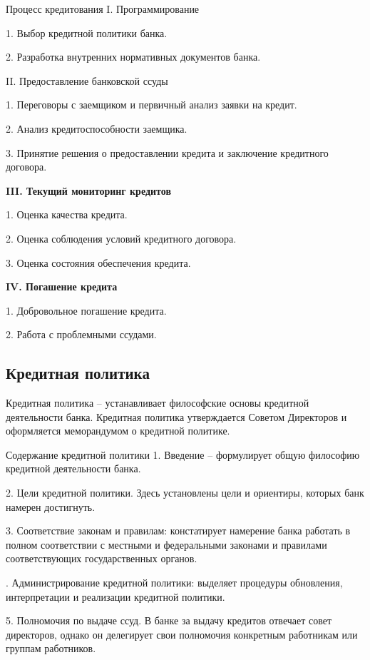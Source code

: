 \documentclass[_Banking_p2.tex]{subfiles}
\begin{document}
\begin{frame}[ allowframebreaks ]{Процесс кредитования}
I. Программирование

1. Выбор кредитной политики банка.

2. Разработка внутренних нормативных
документов банка.

\vspace{1em}
II. Предоставление банковской ссуды

1. Переговоры с заемщиком и первичный анализ
заявки на кредит.

2. Анализ кредитоспособности заемщика.

3. Принятие решения о предоставлении кредита и
заключение кредитного договора.

\pagebreak
\textbf{III. Текущий мониторинг кредитов}

1. Оценка качества кредита.

2. Оценка соблюдения условий кредитного договора.

3. Оценка состояния обеспечения кредита.

\vspace{1em}
\textbf{IV. Погашение кредита}

1. Добровольное погашение кредита.

2. Работа с проблемными ссудами.

\end{frame}

\subsection{Кредитная политика}
\begin{frame}
\begin{block}{Кредитная политика}
	\quad	– устанавливает философские основы
	кредитной деятельности банка. Кредитная
	политика утверждается Советом Директоров и
	оформляется меморандумом о кредитной
	политике.
\end{block}
\end{frame}
\begin{frame}[ allowframebreaks ]{Содержание кредитной политики}
1. Введение – формулирует общую философию
кредитной деятельности банка.

2. Цели кредитной политики. Здесь установлены
цели и ориентиры, которых банк намерен
достигнуть.

3. Соответствие законам и правилам:
констатирует намерение банка работать в полном
соответствии с местными и федеральными
законами и правилами соответствующих
государственных органов.

. Администрирование кредитной политики:
выделяет процедуры обновления, интерпретации
и реализации кредитной политики.

5. Полномочия по выдаче ссуд. В банке за
выдачу кредитов отвечает совет директоров,
однако он делегирует свои полномочия
конкретным работникам или группам работников.

\end{frame}
\end{document}
